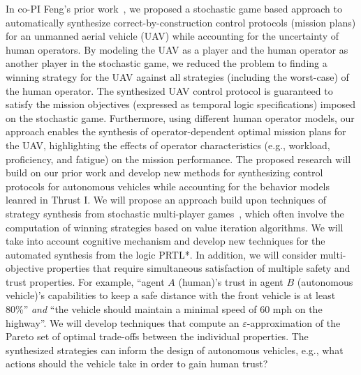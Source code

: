 In co-PI Feng's prior work~\cite{feng2015controller,feng2016synthesis}, we proposed a stochastic game based approach to automatically synthesize correct-by-construction control protocols (mission plans) for an unmanned aerial vehicle (UAV) while accounting for the uncertainty of human operators. By modeling the UAV as a player and the human operator as another player in the stochastic game, we reduced the problem to finding a winning strategy for the UAV against all strategies (including the worst-case) of the human operator. The synthesized UAV control protocol is guaranteed to satisfy the mission objectives (expressed as temporal logic specifications) imposed on the stochastic game. Furthermore, using different human operator models, our approach enables the synthesis of operator-dependent optimal mission plans for the UAV, highlighting the effects of operator characteristics (e.g., workload, proficiency, and fatigue) on the mission performance. The proposed research will build on our prior work and develop new methods for synthesizing control protocols for autonomous vehicles while accounting for the behavior models leanred in Thrust I. We will propose an approach build upon techniques of strategy synthesis from stochastic multi-player games~\cite{SK16}, which often involve the computation of winning strategies based on value iteration algorithms. 
We will take into account cognitive mechanism and develop new techniques for the automated synthesis from the logic PRTL*. 
In addition, we will consider multi-objective properties that require simultaneous satisfaction of multiple safety and trust properties.
For example, ``agent $A$ (human)'s trust in agent $B$ (autonomous vehicle)'s capabilities to keep a safe distance with the front vehicle is at least 80\%'' \emph{and} ``the vehicle should maintain a minimal speed of 60 mph on the highway''.
We will develop techniques that compute an $\varepsilon$-approximation of the Pareto set of optimal trade-offs between the individual properties.
The synthesized strategies can inform the design of autonomous vehicles, e.g., what actions should the vehicle take in order to gain human trust?
   